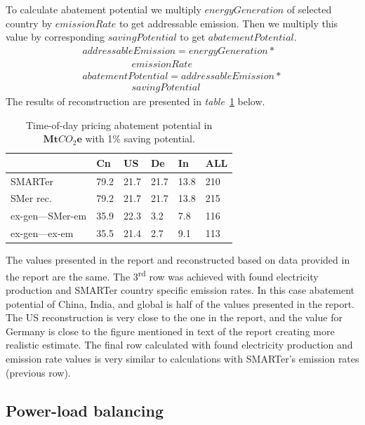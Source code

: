 \documentclass[11pt, twocolumn]{article}
\newcommand{\ts}{\textsuperscript}
\begin{document}
To calculate abatement potential we multiply $energyGeneration$ of selected country by $emissionRate$ to get addressable emission. Then we multiply this value by corresponding $savingPotential$ to get $abatementPotential$.
\begin{gather*}
  addressableEmission = energyGeneration *\\
  \quad\quad\quad\quad\quad emissionRate\\
  abatementPotential = addressableEmission *\\
  \quad\quad\quad\quad\quad savingPotential
\end{gather*}
The results of reconstruction are presented in \emph{table}~\ref{tab:todp} below.
\begin{center}
  \begin{table}[h]
    \begin{tabular}{ p{} | p{} | p{} | p{} | p{} | p{} }
       & Cn & US & De & In & ALL \\
      \hline
      SMARTer & 79.2 & 21.7 & 21.7 & 13.8 & 210 \\
      SMer rec. & 79.2 & 21.7 & 21.7 & 13.8 & 215 \\
      ex-gen---SMer-em & 35.9 & 22.3 & 3.2 & 7.8 & 116 \\
      ex-gen---ex-em & 35.5 & 21.4 & 2.7 & 9.1 & 113
    \end{tabular}
    \caption{Time-of-day pricing abatement potential in $\mathbf{Mt}CO_2\mathbf{e}$ with 1\% saving potential. \label{tab:todp}}
  \end{table}
\end{center}

The values presented in the report and reconstructed based on data provided in the report are the same. The 3\ts{rd} row was achieved with found electricity production and SMARTer country specific emission rates. In this case abatement potential of China, India, and global is half of the values presented in the report. The US reconstruction is very close to the one in the report, and the value for Germany is close to the figure mentioned in text of the report creating more realistic estimate. The final row calculated with found electricity production and emission rate values is very similar to calculations with SMARTer's emission rates (previous row).



\subsection{Power-load balancing}
\end{document}
